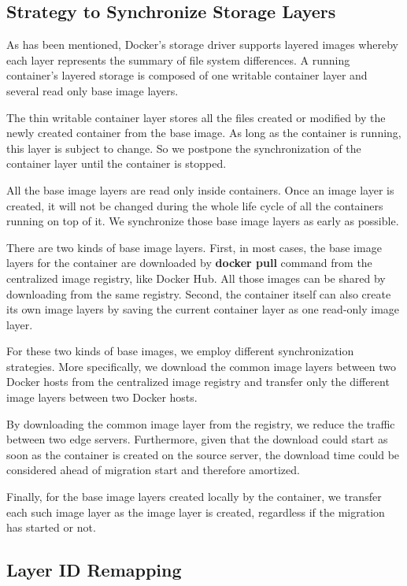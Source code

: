 \subsection{Strategy to Synchronize Storage Layers} \label{design:syncImage}

As has been mentioned, Docker's storage driver supports layered images whereby each layer represents the summary of file system differences. A running container's layered storage is composed of one writable container layer and several read only base image layers. 

The thin writable container layer stores all the files created or modified by the newly created container from the base image. As long as the container is running, this layer is subject to change. So we postpone the synchronization of the container layer until the container is stopped.

All the base image layers are read only inside containers. Once an image layer is created, it will not be changed during the whole life cycle of all the containers running on top of it. We synchronize those base image layers as early as possible.

There are two kinds of base image layers. First, in most cases, the base image layers for the container are downloaded by \textbf{docker pull} command from the centralized image registry, like Docker Hub. All those images can be shared by downloading from the same registry. Second, the container itself can also create its own image layers by saving the current container layer as one read-only image layer. 

For these two kinds of base images, we employ different synchronization strategies. More specifically, we download the common image layers between two Docker hosts from the centralized image registry and transfer only the different image layers between two Docker hosts.

By downloading the common image layer from the registry, we reduce the traffic between two edge servers. Furthermore, given that the download could start as soon as the container is created on the source server, the download time could be considered ahead of migration start and therefore amortized.

Finally, for the base image layers created locally by the container, we transfer each such image layer as the image layer is created, regardless if the migration has started or not. 

\subsection{Layer ID Remapping} \label{design:idremapping}

